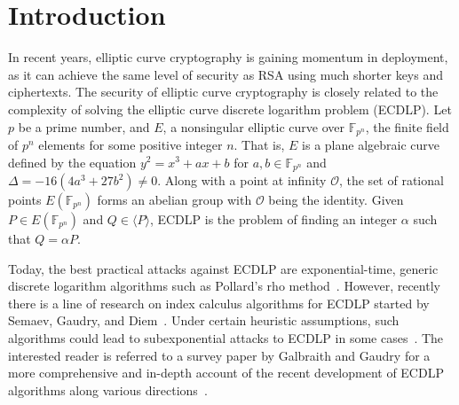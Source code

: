 \documentclass{llncs}
\newcommand{\F}[1]{\ensuremath{\mathbb F_{#1}}}
\begin{document}
\section{Introduction}
%
In recent years, elliptic curve cryptography is gaining momentum in
deployment, as it can achieve the same level of security as RSA using
much shorter keys and ciphertexts.
%
The security of elliptic curve cryptography is closely related to the
complexity of solving the elliptic curve discrete logarithm problem
(ECDLP).
%
Let $p$ be a prime number, and $E$, a nonsingular elliptic curve over
\F{p^n}, the finite field of $p^n$ elements for some positive integer
$n$.
%
That is, $E$ is a plane algebraic curve defined by the equation
$y^2=x^3+ax+b$ for $a,b\in\F{p^n}$ and $\Delta=-16(4a^3+27b^2)\neq 0$.
%
Along with a point at infinity $\mathcal O$, the set of rational
points $E(\F{p^n})$ forms an abelian group with $\mathcal O$ being the
identity.
%
Given $P\in E(\F{p^n})$ and $Q\in\langle P\rangle$, ECDLP is the
problem of finding an integer $\alpha$ such that $Q=\alpha P$.

Today, the best practical attacks against ECDLP are exponential-time,
generic discrete logarithm algorithms such as Pollard's rho
method~\cite{1978-pollard-kangaroo}.
%
However, recently there is a line of research on index calculus
algorithms for ECDLP started by Semaev, Gaudry, and
Diem~\cite{DBLP:journals/iacr/Semaev04,DBLP:journals/jsc/Gaudry09,DBLP:journals/moc/Diem11}.
%
Under certain heuristic assumptions, such algorithms could lead to
subexponential attacks to ECDLP in some
cases~\cite{DBLP:conf/eurocrypt/FaugerePPR12,DBLP:journals/iacr/PetitQ12,DBLP:conf/iwsec/HuangPST13}.
%
The interested reader is referred to a survey paper by Galbraith and
Gaudry for a more comprehensive and in-depth account of the recent
development of ECDLP algorithms along various
directions~\cite{DBLP:journals/dcc/GalbraithG16}.
\end{document}
